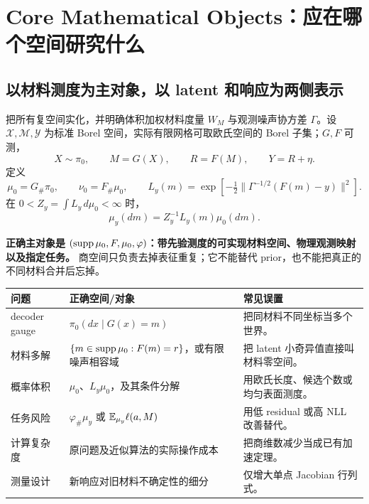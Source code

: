 \section{Core Mathematical Objects：应在哪个空间研究什么}
\label{sec:objects}

\subsection{以材料测度为主对象，以 latent 和响应为两侧表示}
把所有复空间实化，并明确体积加权材料度量 $W_M$ 与观测噪声协方差 $\Gamma$。设 $\mathcal X,\mathcal M,\mathcal Y$ 为标准 Borel 空间，实际有限网格可取欧氏空间的 Borel 子集；$G,F$ 可测，
\[
X\sim\pi_0,\qquad M=G(X),\qquad R=F(M),\qquad Y=R+\eta.
\]
定义
\[
\mu_0=G_\#\pi_0,\qquad \nu_0=F_\#\mu_0,\qquad
L_y(m)=\exp\!\left[-\tfrac12\|\Gamma^{-1/2}(F(m)-y)\|^2\right].
\]
在 $0<Z_y=\int L_y\,d\mu_0<\infty$ 时，
\begin{equation}
\mu_y(dm)=Z_y^{-1}L_y(m)\mu_0(dm).
\label{eq:material-posterior}
\end{equation}

\textbf{正确主对象是 $(\operatorname{supp}\mu_0,F,\mu_0,\varphi)$：带先验测度的可实现材料空间、物理观测映射以及指定任务。} 商空间只负责去掉表征重复；它不能替代 prior，也不能把真正的不同材料合并后忘掉。

\begin{longtable}{p{.23\linewidth}p{.34\linewidth}p{.35\linewidth}}
\toprule
问题 & 正确空间/对象 & 常见误置\\
\midrule
decoder gauge & $\pi_0(dx\mid G(x)=m)$ & 把同材料不同坐标当多个世界。\\
材料多解 & $\{m\in\operatorname{supp}\mu_0:F(m)=r\}$，或有限噪声相容域 & 把 latent 小奇异值直接叫材料零空间。\\
概率体积 & $\mu_0$、$L_y\mu_0$，及其条件分解 & 用欧氏长度、候选个数或均匀表面测度。\\
任务风险 & $\varphi_\#\mu_y$ 或 $\mathbb E_{\mu_y}\ell(a,M)$ & 用低 residual 或高 NLL 改善替代。\\
计算复杂度 & 原问题及近似算法的实际操作成本 & 把商维数减少当成已有加速定理。\\
测量设计 & 新响应对旧材料不确定性的细分 & 仅增大单点 Jacobian 行列式。\\
\bottomrule
\end{longtable}

